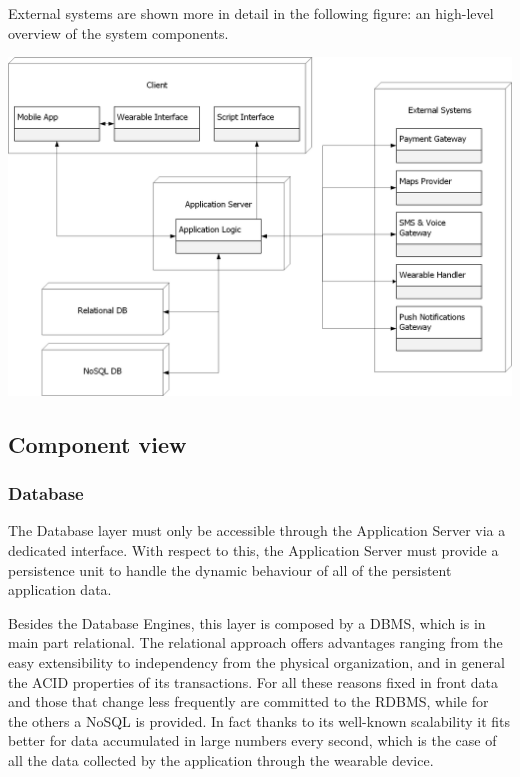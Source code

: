 External systems are shown more in detail in the following figure: an high-level overview of the system components.

\begin{center}
\includegraphics[scale=0.6]{sections/diagrams/highlevel.png}
\newline
{}
\end{center}

\subsection{Component view}
\subsubsection{Database}
The Database layer must only be accessible through the Application Server via a dedicated interface. With respect to this, the Application Server must provide a persistence unit to handle the dynamic behaviour of all of the persistent application data. \newline

Besides the Database Engines, this layer is composed by a DBMS, which is in main part relational. The relational approach offers advantages ranging from the easy extensibility to independency from the physical organization, and in general the ACID properties of its transactions. For all these reasons fixed in front data and those that change less frequently are committed to the RDBMS, while for the others a NoSQL is provided. In fact thanks to its well-known scalability it fits better for data accumulated in large numbers every second, which is the case of all the data collected by the application through the wearable device. \newline

